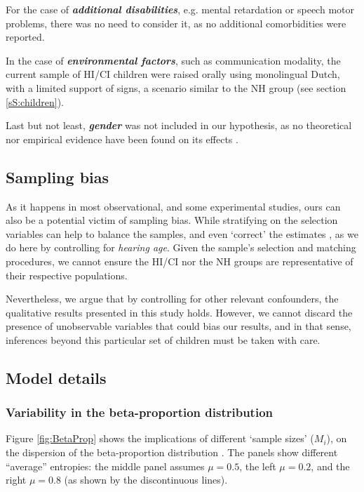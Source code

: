 For the case of \textbf{\textit{additional disabilities}}, e.g. mental retardation or speech motor problems, there was no need to consider it, as no additional comorbidities were reported.

In the case of \textbf{\textit{environmental factors}}, such as communication modality, the current sample of HI/CI children were raised orally using monolingual Dutch, with a limited support of signs, a scenario similar to the NH group (see section \ref{sS:children}).

Last but not least, \textbf{\textit{gender}} was not included in our hypothesis, as no theoretical nor empirical evidence have been found on its effects \cite{Boonen_et_al_2021}.
%
%
\subsection{Sampling bias} \label{sSA:sampling_bias}
%
As it happens in most observational, and some experimental studies, ours can also be a potential victim of sampling bias. While stratifying on the selection variables can help to balance the samples, and even `correct' the estimates \cite{Cinelli_et_al_2021, Deffner_et_al_2022}, as we do here by controlling for \textit{hearing age}. Given the sample's selection and matching procedures, we cannot ensure the HI/CI nor the NH groups are representative of their respective populations. 

Nevertheless, we argue that by controlling for other relevant confounders, the qualitative results presented in this study holds. However, we cannot discard the presence of unobservable variables that could bias our results, and in that sense, inferences beyond this particular set of children must be taken with care.
%
%
\subsection{Model details} \label{sSA:model_details}
%
\subsubsection{Variability in the beta-proportion distribution} \label{ssSA:model_variability}
%
Figure \ref{fig:BetaProp} shows the implications of different `sample sizes' ($M_{i}$), on the dispersion of the beta-proportion distribution \cite{Kruschke_2015}. The panels show different ``average'' entropies: the middle panel assumes $\mu=0.5$, the left $\mu=0.2$, and the right $\mu=0.8$ (as shown by the discontinuous lines).

